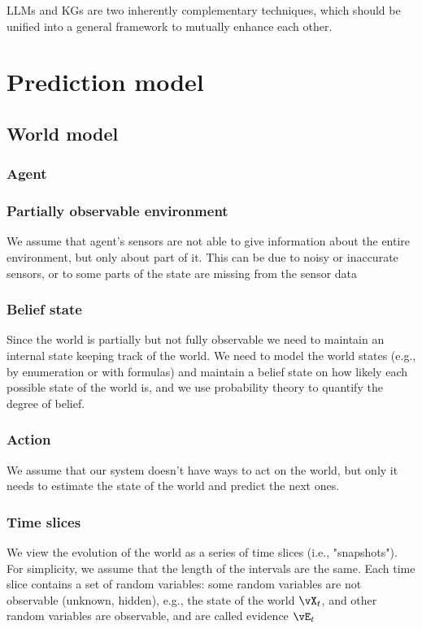 \documentclass[11pt, reqno]{amsart}
\theoremstyle{definition}
\theoremstyle{remark}
\begin{document}
  LLMs and KGs are two inherently complementary techniques, which should be unified
  into a general framework to mutually enhance each other.

  \section{Prediction model}

  \subsection{World model}

  \subsubsection{Agent}

  \subsubsection{Partially observable environment}
  We assume that agent's sensors are not able to give information about the
  entire environment, but only about part of it.
  This can be due to noisy or inaccurate sensors, or to some parts of the state
  are missing from the sensor data

  \subsubsection{Belief state}
  Since the world is partially but not fully observable we need to maintain an
  internal state keeping track of the world.
  We need to model the world states (e.g., by enumeration or with formulas) and
  maintain a belief state on how likely each possible state of the world is,
  and we use probability theory to quantify the degree of belief.

  \subsubsection{Action}
  We assume that our system doesn't have ways to act on the world, but only it
  needs to estimate the state of the world and predict the next ones.

  \subsubsection{Time slices}
  We view the evolution of the world as a series of time slices (i.e., "snapshots").
  For simplicity, we assume that the length of the intervals are the same.
  Each time slice contains a set of random variables: some random variables are
  not observable (unknown, hidden), e.g., the state of the world $\vX_t$, and
  other random variables are observable, and are called evidence $\vE_t$
\end{document}
